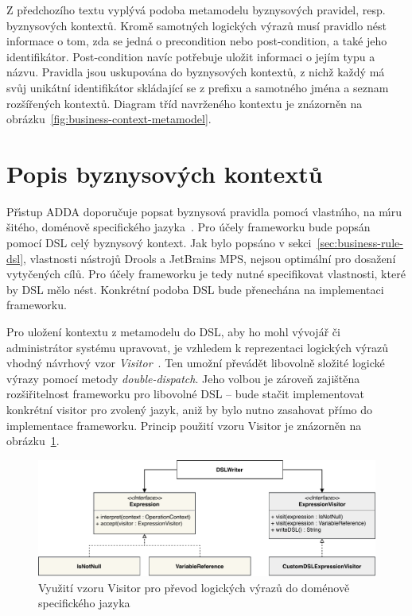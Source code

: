 Z předchozího textu vyplývá podoba metamodelu byznysových pravidel, resp. byznysových kontextů.
Kromě samotných logických výrazů musí pravidlo nést informace o tom, zda
se jedná o precondition nebo post-condition, a také jeho identifikátor.
Post-condition navíc potřebuje uložit informaci o jejím typu a názvu. Pravidla jsou uskupována
do byznysových kontextů, z nichž každý má svůj unikátní identifikátor skládající se z prefixu
a samotného jména a seznam rozšířených kontextů. Diagram tříd navrženého kontextu je znázorněn
na obrázku~\ref{fig:business-context-metamodel}.

\section{Popis byznysových kontextů}

Př\'{\i}stup \gls{ADDA} doporučuje popsat byznysová pravidla pomoc\'{\i}
vlastn\'{\i}ho, na m\'{\i}ru šitého, doménově specifického jazyka~\cite{cemus2015automated}.
Pro účely frameworku bude popsán pomocí \gls{DSL} celý byznysový kontext.
Jak bylo popsáno v sekci~\ref{sec:business-rule-dsl}, vlastnosti nástrojů Drools a JetBrains MPS,
nejsou optimální pro dosažení vytyčených cílů. Pro účely frameworku je tedy nutné specifikovat vlastnosti,
které by \gls{DSL} mělo nést. Konkrétní podoba DSL bude přenechána na implementaci frameworku.

Pro uložení kontextu z metamodelu do \gls{DSL}, aby ho mohl vývojář či administrátor
systému upravovat, je vzhledem k reprezentaci logických výrazů vhodný návrhový vzor
\textit{Visitor}~\cite{fowler2002patterns}. Ten umožní převádět libovolně složité logické
výrazy pomocí metody \textit{double-dispatch}. Jeho volbou je zároveň zajištěna rozšiřitelnost
frameworku pro libovolné \gls{DSL} -- bude stačit implementovat konkrétní
visitor pro zvolený jazyk, aniž by bylo nutno zasahovat přímo do implementace frameworku.
Princip použití vzoru Visitor je znázorněn na obrázku~\ref{fig:expression-visitor}.

\begin{figure}
    \centering
    \includegraphics[keepaspectratio=true, width=1\linewidth]{figures/expression-visitor.pdf}
    \caption{Využití vzoru Visitor pro převod logických výrazů do doménově specifického jazyka}
    \label{fig:expression-visitor}
\end{figure}

